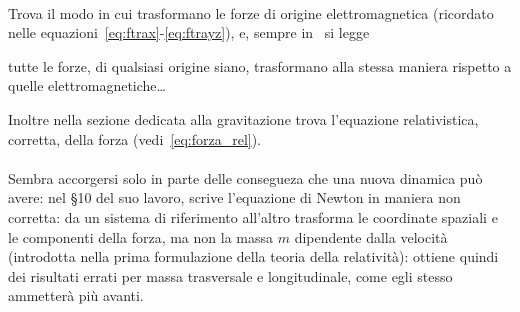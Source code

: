 \paragraph{\poin} 
Trova il modo in cui trasformano le forze di origine elettromagnetica
(ricordato nelle equazioni~\eqref{eq:ftrax}-\eqref{eq:ftrayz}), e,
sempre in~\cite{carro1} si legge
\begin{citaz}
 [\ldots] tutte le forze, di qualsiasi origine siano, trasformano alla
 stessa maniera rispetto a quelle elettromagnetiche\ldots
\end{citaz}
Inoltre nella sezione dedicata alla gravitazione trova
l'equazione relativistica, corretta, della forza (vedi~\eqref{eq:forza_rel}).
\paragraph{\ein} %
Sembra accorgersi solo in parte delle consegueza che una nuova
dinamica pu\`o avere:
nel \S 10 del suo lavoro, scrive l'equazione di Newton in maniera non
corretta: da un sistema di riferimento all'altro trasforma le
coordinate spaziali e le componenti della forza, ma non la massa $m$
dipendente dalla velocit\`a (introdotta nella prima formulazione della
teoria della relativit\`a):
ottiene quindi dei risultati errati per massa trasversale e
longitudinale, come egli stesso ammetter\`a pi\`u avanti.

